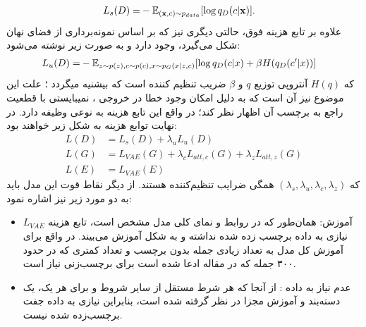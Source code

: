 \begin{equation}
	\begin{split}
		L_{s} (D) =& -\mathbb E_{({\bf x},c) \sim p_{data}} [\log q_D(c|{\bf x})].
	\end{split}
\end{equation}
علاوه بر تابع هزینه فوق، حالتی دیگری نیز که بر اساس نمونه‌برداری از فضای نهان شکل می‌گیرد، وجود دارد و به صورت زیر نوشته می‌شود:
\begin{equation}
	\begin{split}
		L_{u} (D) =& -\mathbb E_{z \sim p(z), c \sim p(c), x \sim p_G(x|z,c)} [\log q_D(c|x) + \beta H(q_D(c'|x))]
	\end{split}
\end{equation}
که $H(q)$ آنتروپی توزیع $q$ و $\beta$ ضریب تنظیم کننده است که بیشنیه میگردد \cite{toward}؛ علت این موضوع نیز آن است که به دلیل امکان وجود خطا در خروجی \decoder{}، \classifier{} نمیبایستی با قطعیت راجع به برچسب آن اظهار نظر کند؛ در واقع این تابع هزینه به نوعی وظیفه \augmentation{} دارد.
در نهایت توابع هزینه به شکل زیر خواهند بود:
\begin{equation}
	\begin{split}
		L (D) &= L_{s} (D) + \lambda_u L_{u} (D)\\
		L (G) &= L_{VAE} (G) + \lambda_c L_{att, c} (G) + \lambda_z L_{att, z} (G)\\
		L (E) &= L_{VAE} (E)
	\end{split}
\end{equation}
که $(\lambda_s, \lambda_u, \lambda_c , \lambda_z)$ همگی ضرایب تنظیم‌کننده هستند. از دیگر نقاط قوت این مدل باید به دو مورد زیر نیز اشاره نمود:
\renewcommand{\labelitemi}{$\bullet$}
\begin{itemize}
	\item

	      آموزش:
	      همان‌طور که در روابط و نمای کلی مدل مشخص است، تابع هزینه $L_{VAE}$ نیازی به داده برچسب زده شده نداشته و به شکل \semisupervised{} آموزش می‌بیند. در واقع برای آموزش کل مدل به تعداد زیادی جمله بدون برچسب و تعداد کمتری که در حدود ۳۰۰ جمله که در مقاله ادعا شده است برای برچسب‌زنی نیاز است.
	\item
	      عدم نیاز به داده :
	      از آنجا که هر شرط مستقل از سایر شروط و برای هر یک، یک دسته‌بند و آموزش مجزا در نظر گرفته شده است، بنابراین نیازی به داده جفت برچسب‌زده شده نیست.
\end{itemize}